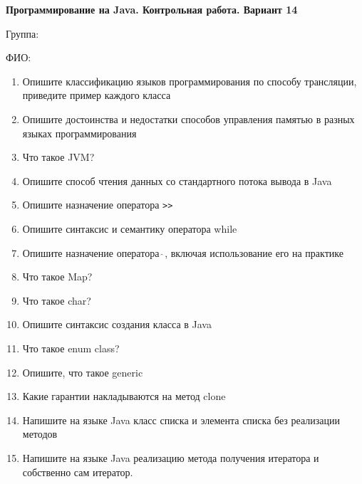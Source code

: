 \documentclass[12pt]{article}
\begin{document}
\newpage\begin{minipage}{\textwidth}
\textbf{Программирование на Java. Контрольная работа. Вариант 14}

Группа: \underline{\hspace{3cm}}

ФИО: \underline{\hspace{10cm}}

\begin{enumerate}
\item Опишите классификацию языков программирования по способу трансляции, приведите пример каждого класса
\item Опишите достоинства и недостатки способов управления памятью в разных языках программирования
\item Что такое JVM?
\item Опишите способ чтения данных со стандартного потока вывода в Java
\item Опишите назначение оператора \verb|>>|
\item Опишите синтаксис и семантику оператора while
\item Опишите назначение оператора $\hat{\ }$, включая использование его на практике
\item Что такое Map?
\item Что такое char?
\item Опишите синтаксис создания класса в Java
\item Что такое enum class?
\item Опишите, что такое generic
\item Какие гарантии накладываются на метод clone
\item Напишите на языке Java класс списка и элемента списка без реализации методов
\item Напишите на языке Java реализацию метода получения итератора и собственно сам итератор.

\end{enumerate}
\end{minipage}
\end{document}
